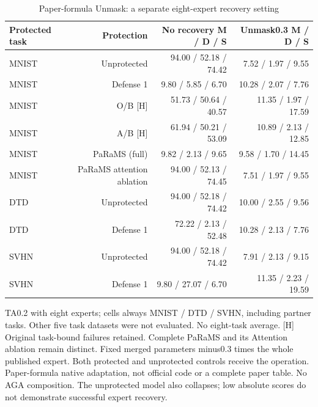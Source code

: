 \begin{table}[!htbp]
\centering
\small
\caption{Paper-formula Unmask: a separate eight-expert recovery setting}
\label{tab:unmask}
\begin{tabular}{lrrr}
\toprule
Protected task & Protection & No recovery M / D / S & Unmask0.3 M / D / S \\
\midrule
MNIST & Unprotected & 94.00 / 52.18 / 74.42 & 7.52 / 1.97 / 9.55 \\
MNIST & Defense 1 & 9.80 / 5.85 / 6.70 & 10.28 / 2.07 / 7.76 \\
MNIST & O/B [H] & 51.73 / 50.64 / 40.57 & 11.35 / 1.97 / 17.59 \\
MNIST & A/B [H] & 61.94 / 50.21 / 53.09 & 10.89 / 2.13 / 12.85 \\
MNIST & PaRaMS (full) & 9.82 / 2.13 / 9.65 & 9.58 / 1.70 / 14.45 \\
MNIST & PaRaMS attention ablation & 94.00 / 52.13 / 74.45 & 7.51 / 1.97 / 9.55 \\
DTD & Unprotected & 94.00 / 52.18 / 74.42 & 10.00 / 2.55 / 9.56 \\
DTD & Defense 1 & 72.22 / 2.13 / 52.48 & 10.28 / 2.13 / 7.76 \\
SVHN & Unprotected & 94.00 / 52.18 / 74.42 & 7.91 / 2.13 / 9.15 \\
SVHN & Defense 1 & 9.80 / 27.07 / 6.70 & 11.35 / 2.23 / 19.59 \\
\bottomrule
\end{tabular}
\par\vspace{3pt}\begin{minipage}{0.98\linewidth}\footnotesize TA0.2 with eight experts; cells always MNIST / DTD / SVHN, including partner tasks. Other five task datasets were not evaluated. No eight-task average. [H] Original task-bound failures retained. Complete PaRaMS and its Attention ablation remain distinct. Fixed merged parameters minus0.3 times the whole published expert. Both protected and unprotected controls receive the operation. Paper-formula native adaptation, not official code or a complete paper table. No AGA composition. The unprotected model also collapses; low absolute scores do not demonstrate successful expert recovery.\end{minipage}
\end{table}

